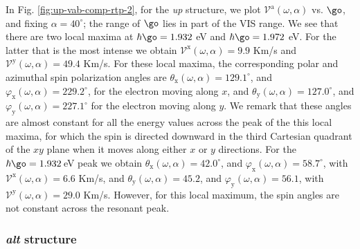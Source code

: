 \documentclass[prb,11pt,tightenlines,twocolumn,aps]{revtex4-1}
\begin{document}

% 

In  
Fig. \ref{fig:up-vab-comp-rtp-2},  for 
the {\it up} structure, 
we plot 
$\mathcal{V}^{\mathrm{a}} (\omega,\alpha)$ vs. $\go$, and 
fixing $\alpha=40^{\circ}$; the range of $\go$ lies in part of the
VIS range.
We see that there are two local maxima at $\hbar\go=1.932$ eV
and $\hbar\go=1.972$ eV. For the latter that is the most intense
we obtain
$\mathcal{V}^{\mathrm{x}} (\omega,\alpha) =  9.9$ Km/s and  
$\mathcal{V}^{\mathrm{y}} (\omega,\alpha) = 49.4$ Km/s.
For these local maxima, 
the corresponding polar and azimuthal spin
polarization angles are
$\theta_{\mathrm{x}}(\omega,\alpha) =129.1^{\circ}$, and $\varphi_{\mathrm{x}}
(\omega,\alpha) = 229.2^{\circ}$,
for the electron moving along $x$,
and
$\theta_{\mathrm{y}} (\omega,\alpha) = 127.0^{\circ}$,
 and $\varphi_{\mathrm{y}}(\omega,\alpha) = 227.1^{\circ}$
for the electron moving along $y$. 
We remark that these angles
are almost constant for all the energy values across the peak of the
this local maxima, for which the spin is directed 
downward in the third Cartesian quadrant
of the $xy$ plane when it moves along either $x$ or $y$ directions.
For the $\hbar\go=1.932$\,eV peak we obtain  
$\theta_{\mathrm{x}} (\omega,\alpha) = 42.0^{\circ}$, and 
$\varphi_{\mathrm{x}}(\omega,\alpha) = 58.7^{\circ}$, with
$\mathcal{V}^{\mathrm{x}} (\omega,\alpha) =  6.6$ Km/s,
 and 
$\theta_{\mathrm{y}}(\omega,\alpha) =45.2$, and 
$\varphi_{\mathrm{y}}(\omega,\alpha) = 56.1$, with
$\mathcal{V}^{\mathrm{y}} (\omega,\alpha) =  29.0$ Km/s.
However, for this local maximum, the spin angles are not constant
across the resonant peak.  

\subsubsection{{\it alt} structure}
\end{document}
